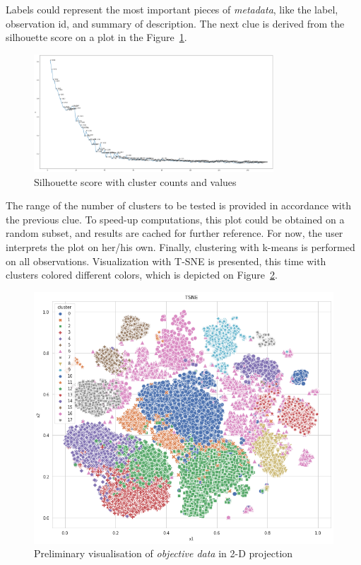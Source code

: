 \documentclass[
 twocolumn,
 hf,
]{ceurart}
\begin{document}
Labels could represent the most important pieces of \textit{metadata}, like the label, observation id, and summary of description.
The next clue is derived from the silhouette score on a plot in the Figure~\ref{fig:silhouette}.
\begin{figure}[h!]
  \centering
  \includegraphics[width=0.8\textwidth]{example1-clustering-products-fashion-tex/output_58_0}
  \caption{Silhouette score with cluster counts and values}
  \label{fig:silhouette}
\end{figure}
The range of the number of clusters to be tested is provided in accordance with the previous clue.
To speed-up computations, this plot could be obtained on a random subset, and results are cached for further reference.
For now, the user interprets the plot on her/his own.
Finally, clustering with k-means is performed on all observations.
Visualization with T-SNE is presented, this time with clusters colored different colors, which is depicted on Figure~\ref{fig:kmeans}.
\begin{figure}[h!]
  \centering
  \includegraphics[width=\linewidth]{example1-clustering-products-fashion-tex/output_59_0}
  \caption{Preliminary visualisation of \textit{objective data} in 2-D projection}
  \label{fig:kmeans}
\end{figure}
\end{document}
